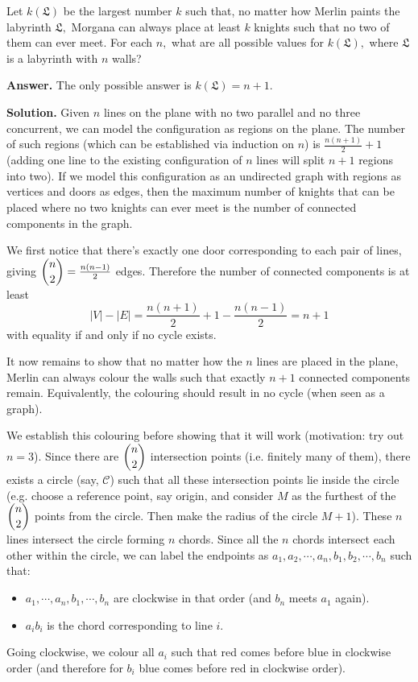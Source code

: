 \documentclass[11pt,a4paper]{article}
\begin{document}
\begin{enumerate}
	Let $k(\mathfrak{L})$ be the largest number $k$ such that, no matter how Merlin paints the labyrinth $\mathfrak{L},$ Morgana can always place at least $k$ knights such that no two of them can ever meet. For each $n,$ what are all possible values for $k(\mathfrak{L}),$ where $\mathfrak{L}$ is a labyrinth with $n$ walls?
	
	\textbf{Answer.} The only possible answer is $k(\mathfrak{L})=n+1$. 
	
	\textbf{Solution.} Given $n$ lines on the plane with no two parallel and no three concurrent, we can model the configuration as regions on the plane. The number of such regions (which can be established via induction on $n$) is $\frac{n(n+1)}{2}+1$ (adding one line to the existing configuration of $n$ lines will split $n+1$ regions into two). If we model this configuration as an undirected graph with regions as vertices and doors as edges, then the maximum number of knights that can be placed where no two knights can ever meet is the number of connected components in the graph. 
	
	We first notice that there's exactly one door corresponding to each pair of lines, giving $\dbinom{n}{2}=\frac{n(n-1)}{2}$ edges. Therefore the number of connected components is at least 
	\[
	|V|-|E| = \frac{n(n+1)}{2}+1 - \frac{n(n-1)}{2} = n+1
	\]
	with equality if and only if no cycle exists. 
	
	It now remains to show that no matter how the $n$ lines are placed in the plane, Merlin can always colour the walls such that exactly $n+1$ connected components remain. Equivalently, the colouring should result in no cycle (when seen as a graph). 
	
	We establish this colouring before showing that it will work (motivation: try out $n=3$). Since there are $\dbinom{n}{2}$ intersection points (i.e. finitely many of them), there exists a circle (say, $\mathcal{C}$) such that all these intersection points lie inside the circle (e.g. choose a reference point, say origin, and consider $M$ as the furthest of the $\dbinom{n}{2}$ points from the circle. Then make the radius of the circle $M+1$). These $n$ lines intersect the circle forming $n$ chords. 
	Since all the $n$ chords intersect each other within the circle, we can label the endpoints as $a_1, a_2, \cdots , a_n, b_1, b_2, \cdots, b_n$ such that: 
	\begin{itemize}
		\item $a_1, \cdots, a_n, b_1, \cdots, b_n$ are clockwise in that order (and $b_n$ meets $a_1$ again). 
		\item $a_ib_i$ is the chord corresponding to line $i$. 
	\end{itemize}
	Going clockwise, we colour all $a_i$ such that red comes before blue in clockwise order (and therefore for $b_i$ blue comes before red in clockwise order). 
	

\end{enumerate}
\end{document}
